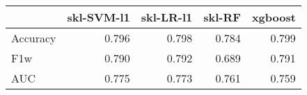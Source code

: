 \begin{tabular}{lrrrr}
\toprule
{} &  skl-SVM-l1 &  skl-LR-l1 &  skl-RF &  xgboost \\
\midrule
Accuracy &       0.796 &      0.798 &   0.784 &    0.799 \\
F1w      &       0.790 &      0.792 &   0.689 &    0.791 \\
AUC      &       0.775 &      0.773 &   0.761 &    0.759 \\
\bottomrule
\end{tabular}

